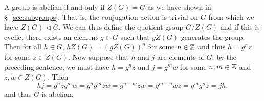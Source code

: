 \begin{example}
    \label{ex:quotient-by-center-cyclic}
    A group is abelian if and only if \(Z(G) = G\) as we have shown in
    \S~\ref{sec:subgroups}. That is, the conjugation action is trivial on \(G\)
    from which we have \(Z(G) \triangleleft G\). We can thus define the quotient
    group \(G/Z(G)\) and if this is cyclic, there exists an element \(g \in G\)
    such that \(gZ(G)\) generates the group. Then for all \(h \in G\), \(hZ(G) =
    (gZ(G))^n\) for some \(n \in \mathbb{Z}\) and thus \(h = g^nz\) for some \(z \in
    Z(G)\). Now suppose that \(h\) and \(j\) are elements of \(G\); by the
    preceding sentence, we must have \(h = g^nz\) and \(j = g^mw\) for some \(n,
    m \in \mathbb{Z}\) and \(z, w \in Z(G)\). Then
    \[
        hj = g^nzg^mw = g^ng^mzw = g^{n+m}zw = g^{m+n}wz = g^mg^nz = jh,
    \]
    and thus \(G\) is abelian.
\end{example}

